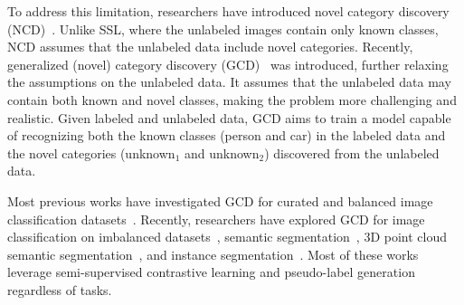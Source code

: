 To address this limitation, researchers have introduced novel category discovery (NCD)~\cite{han2019learning}. Unlike SSL, where the unlabeled images contain only known classes, NCD assumes that the unlabeled data include novel categories. Recently, generalized (novel) category discovery (GCD)~\cite{vaze2022generalized, cao2021open} was introduced, further relaxing the assumptions on the unlabeled data. It assumes that the unlabeled data may contain both known and novel classes, making the problem more challenging and realistic. Given labeled and unlabeled data, GCD aims to train a model capable of recognizing both the known classes (\eg person and car) in the labeled data and the novel categories (\eg unknown$_1$ and unknown$_2$) discovered from the unlabeled data.



Most previous works have investigated GCD for curated and balanced image classification datasets~\cite{vaze2022generalized, An2023Generalized, Zhang2023PromptCAL, Pu2023Dynamic, wen2023parametric}. Recently, researchers have explored GCD for image classification on imbalanced datasets~\cite{Bai2023Towards, li2023imbagcd, li2023generalized}, semantic segmentation~\cite{zhao2022novel}, 3D point cloud semantic segmentation~\cite{riz2023novel}, and instance segmentation~\cite{fomenko2022learning, weng2021unsupervised}. Most of these works leverage semi-supervised contrastive learning and pseudo-label generation regardless of tasks. 

